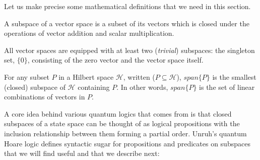 Let us make precise some mathematical definitions that we need in this section.

\begin{definition}
	A subspace of a vector space is a subset of its vectors which is closed under the operations of vector addition and scalar multiplication.
\end{definition}

\begin{remark}
    All vector spaces are equipped with at least two (\textit{trivial}) subspaces: the singleton set, $\{ 0 \}$, consisting of the zero vector and the vector space itself.
\end{remark}

\begin{definition}
	For any subset $P$ in a Hilbert space $\mathcal{H}$, written ($P \subseteq \mathcal{H}$), $\mathit{span}\{P\}$ is the smallest (closed) subspace of $\mathcal{H}$ containing $P$. In other words, $\mathit{span}\{P\}$ is the set of linear combinations of vectors in $P$.
\end{definition}

A core idea behind various quantum logics that comes from \textcite{logicqm36} is that closed subspaces of a state space can be thought of as logical propositions with the inclusion relationship between them forming a partial order. Unruh's quantum Hoare logic defines syntactic sugar for propositions and predicates on subspaces that we will find useful and that we describe next:

